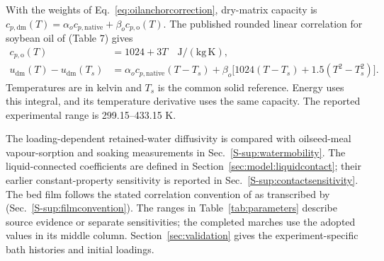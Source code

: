 With the weights of Eq.~\eqref{eq:oilanchorcorrection}, dry-matrix capacity
is $c_{p,\mathrm{dm}}(T)=\alpha_o c_{p,\mathrm{native}}+
\beta_o c_{p,\mathrm{o}}(T)$. The published rounded
linear correlation for soybean oil of \citet{garciarojas2013thermophysical}
(Table 7) gives
\begin{align}
c_{p,\mathrm{o}}(T)&=1024+3T\quad\mathrm{J/(kg\,K)},\label{eq:oilheatcapacity}\\
u_{\mathrm{dm}}(T)-u_{\mathrm{dm}}(T_s)
 &=\alpha_o c_{p,\mathrm{native}}(T-T_s)
   +\beta_o\bigl[1024(T-T_s)+1.5(T^2-T_s^2)\bigr].
\label{eq:drymatrixsensibleenergy}
\end{align}
Temperatures are in kelvin and $T_s$ is the common solid reference.
Energy uses this integral, and its temperature derivative uses the same
capacity. The reported experimental range is 299.15--433.15 K.

The loading-dependent retained-water diffusivity is compared with oilseed-meal
vapour-sorption and soaking measurements in Sec.~\ref*{S-sup:watermobility}.
The liquid-connected coefficients are defined in
Section~\ref{sec:model:liquidcontact}; their earlier constant-property
sensitivity is reported in Sec.~\ref*{S-sup:contactsensitivity}.
The bed film follows
the stated correlation convention of
\citet{faner2008desolventizado} as transcribed by \citet{coletto2022modeling}
(Sec.~\ref*{S-sup:filmconvention}).
The ranges in Table~\ref{tab:parameters} describe source evidence or
separate sensitivities; the completed marches use the adopted values
in its middle column. Section~\ref{sec:validation} gives the
experiment-specific bath histories and initial loadings.

